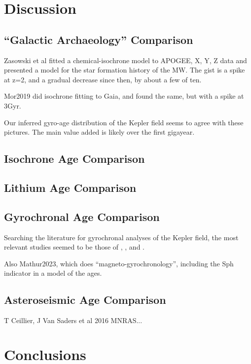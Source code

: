 \documentclass[11pt,twocolumn,tighten]{aastex63}
\begin{document}
\section{Discussion}
\label{sec:disc}

\subsection{``Galactic Archaeology'' Comparison}
Zasowski et al fitted a chemical-isochrone model to APOGEE, X, Y, Z
data and presented a model for the star formation history of the MW.
The gist is a spike at z=2, and a gradual decrease since then, by
about a few of ten.

Mor2019 did isochrone fitting to Gaia, and found the same, but with a
spike at 3Gyr.

Our inferred gyro-age distribution of the Kepler field seems to agree
with these pictures.  The main value added is likely over the first
gigayear.

\subsection{Isochrone Age Comparison}

\subsection{Lithium Age Comparison}

\subsection{Gyrochronal Age Comparison}
Searching the literature for gyrochronal analyses of the Kepler field,
the most relevant studies seemed to be those of
\citet{Walkowicz_2013}, \citet{Reinhold_2015}, and 
\citet{David_2021}.

Also Mathur2023, which does ``magneto-gyrochronology'', including the
Sph indicator in a model of the ages.


\subsection{Asteroseismic Age Comparison}
T Ceillier, J Van Saders et al 2016 MNRAS...


\section{Conclusions}
\label{sec:conclusions}
\end{document}
